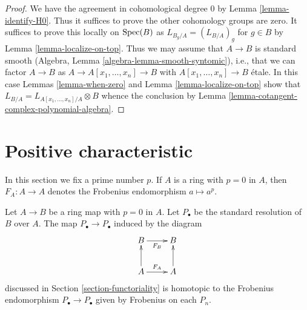 \begin{proof}
We have the agreement in cohomological degree $0$ by
Lemma \ref{lemma-identify-H0}.
Thus it suffices to prove the other cohomology groups
are zero. It suffices to prove this locally on $\mathop{\mathrm{Spec}}(B)$ as
$L_{B_g/A} = (L_{B/A})_g$ for $g \in B$ by Lemma \ref{lemma-localize-on-top}.
Thus we may assume that $A \to B$ is standard smooth
(Algebra, Lemma \ref{algebra-lemma-smooth-syntomic}), i.e.,
that we can factor $A \to B$ as
$A \to A[x_1, \ldots, x_n] \to B$ with $A[x_1, \ldots, x_n] \to B$
\'etale. In this case Lemmas \ref{lemma-when-zero} and
Lemma \ref{lemma-localize-on-top} show that
$L_{B/A} = L_{A[x_1, \ldots, x_n]/A} \otimes B$
whence the conclusion by
Lemma \ref{lemma-cotangent-complex-polynomial-algebra}.
\end{proof}





\section{Positive characteristic}
\label{section-positive-characteristic}

\noindent
In this section we fix a prime number $p$.
If $A$ is a ring with $p = 0$ in $A$, then $F_A : A \to A$
denotes the Frobenius endomorphism $a \mapsto a^p$.

\begin{lemma}
\label{lemma-frobenius-homotopy}
Let $A \to B$ be a ring map with $p = 0$ in $A$. Let $P_\bullet$ be the
standard resolution of $B$ over $A$. The map $P_\bullet \to P_\bullet$
induced by the diagram
$$
\xymatrix{
B \ar[r]_{F_B} & B \\
A \ar[u] \ar[r]^{F_A} & A \ar[u]
}
$$
discussed in Section \ref{section-functoriality} is homotopic to the Frobenius
endomorphism $P_\bullet \to P_\bullet$ given by Frobenius on each $P_n$.
\end{lemma}

